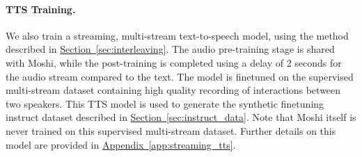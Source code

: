 \paragraph{TTS Training.}

We also train a streaming, multi-stream text-to-speech model, using the method described in \hyperref[sec:interleaving]{Section~\ref{sec:interleaving}}. The audio pre-training stage is shared with Moshi, while the post-training is completed using a delay of 2 seconds for the audio stream compared to the text. The model is finetuned on the supervised multi-stream dataset containing high quality recording of interactions between two speakers. This TTS model is used to generate the synthetic finetuning instruct dataset described in \hyperref[sec:instruct_data]{Section~\ref{sec:instruct_data}}. Note that Moshi itself is never trained on this supervised multi-stream dataset. Further details on this model are provided in \hyperref[app:streaming_tts]{Appendix~\ref{app:streaming_tts}}.
